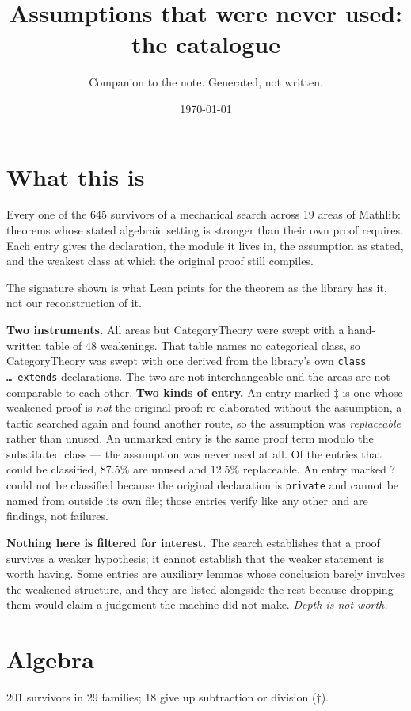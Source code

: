 \documentclass[10pt,a4paper]{article}
\title{Assumptions that were never used: the catalogue}
\author{Companion to the note. Generated, not written.}
\date{\today}
\begin{document}
\maketitle
\section*{What this is}
Every one of the 645 survivors of a mechanical search across 19 areas of Mathlib: theorems whose stated algebraic setting is stronger than their own proof requires. Each entry gives the declaration, the module it lives in, the assumption as stated, and the weakest class at which the original proof still compiles.

The signature shown is what Lean prints for the theorem as the library has it, not our reconstruction of it.

\textbf{Two instruments.} All areas but CategoryTheory were swept with a hand-written table of 48 weakenings. That table names no categorical class, so CategoryTheory was swept with one derived from the library's own \texttt{{class \dots\ extends}} declarations. The two are not interchangeable and the areas are not comparable to each other.
\textbf{Two kinds of entry.} An entry marked $\ddagger$ is one whose weakened proof is \emph{not} the original proof: re-elaborated without the assumption, a tactic searched again and found another route, so the assumption was \emph{replaceable} rather than unused. An unmarked entry is the same proof term modulo the substituted class --- the assumption was never used at all. Of the entries that could be classified, 87.5\% are unused and 12.5\% replaceable. An entry marked ? could not be classified because the original declaration is \texttt{private} and cannot be named from outside its own file; those entries verify like any other and are findings, not failures.

\textbf{Nothing here is filtered for interest.} The search establishes that a proof survives a weaker hypothesis; it cannot establish that the weaker statement is worth having. Some entries are auxiliary lemmas whose conclusion barely involves the weakened structure, and they are listed alongside the rest because dropping them would claim a judgement the machine did not make. \emph{Depth is not worth.}

\tableofcontents
\clearpage
\section{Algebra}
201 survivors in 29 families; 18 give up subtraction or division ($\dagger$).
\end{document}
